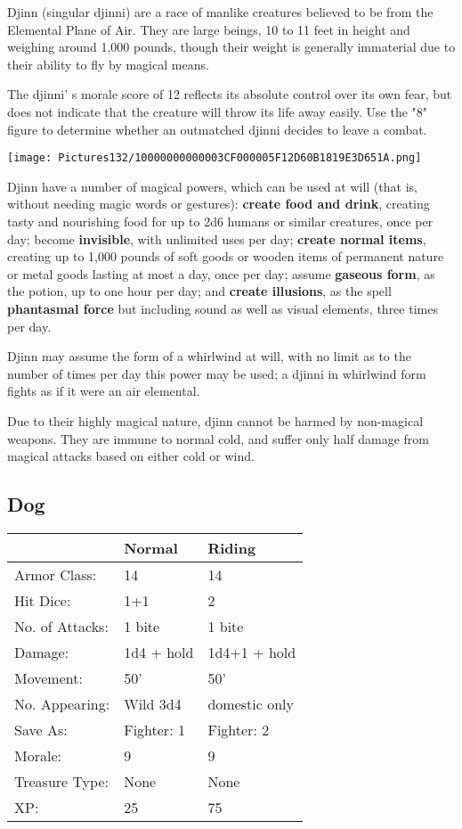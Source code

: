\documentclass[a4paper,twoside,openany,10pt]{book}
\begin{document}
\begin{multicols}{2}
Djinn (singular djinni) are a race of manlike creatures believed to be from the Elemental Plane of Air. They are large beings, 10 to 11 feet in height and weighing around 1,000 pounds, though their weight is generally immaterial due to their ability to fly by magical means.

The djinni' s morale score of 12 reflects its absolute control over its own fear, but does not indicate that the creature will throw its life away easily. Use the "8" figure to determine whether an outmatched djinni decides to leave a combat.


\begin{center}
	\texttt{[image: Pictures132/10000000000003CF000005F12D60B1819E3D651A.png]}
\end{center}

Djinn have a number of magical powers, which can be used at will (that is, without needing magic words or gestures): \textbf{create food and drink}, creating tasty and nourishing food for up to 2d6 humans or similar creatures, once per day; become \textbf{invisible}, with unlimited uses per day; \textbf{create normal items}, creating up to 1,000 pounds of soft goods or wooden items of permanent nature or metal goods lasting at most a day, once per day; assume \textbf{gaseous form}, as the potion, up to one hour per day; and \textbf{create illusions}, as the spell \textbf{phantasmal force} but including sound as well as visual elements, three times per day.

Djinn may assume the form of a whirlwind at will, with no limit as to the number of times per day this power may be used; a djinni in whirlwind form fights as if it were an air elemental.

Due to their highly magical nature, djinn cannot be harmed by non-magical weapons. They are immune to normal cold, and suffer only half damage from magical attacks based on either cold or wind.

\subsection*{Dog}\label{dog}

\begin{tabularx}{0.48\textwidth}{lXX}
& Normal & Riding \\\hline
Armor Class: & 14 & 14 \\\hline
Hit Dice: & 1+1 & 2 \\\hline
No. of Attacks: & 1 bite & 1 bite \\\hline
Damage: & 1d4 + hold & 1d4+1 + hold \\\hline
Movement: & 50' & 50' \\\hline
No. Appearing: & Wild 3d4 & domestic only \\\hline
Save As: & Fighter: 1 & Fighter: 2 \\\hline
Morale: & 9 & 9 \\\hline
Treasure Type: & None & None \\\hline
XP: & 25 & 75 \\\hline
\end{tabularx}\medskip


\end{multicols}
\end{document}
